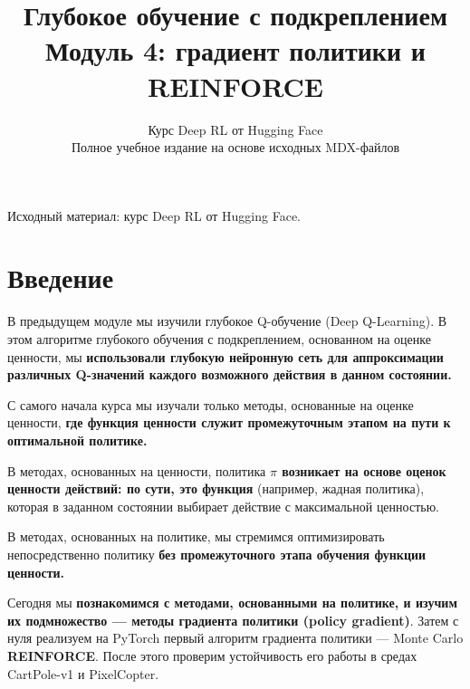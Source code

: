 \documentclass[11pt,a4paper]{article}
\title{\textbf{Глубокое обучение с подкреплением}\\[0.35em]\large Модуль 4: градиент политики и REINFORCE}
\author{Курс Deep RL от Hugging Face\\\small Полное учебное издание на основе исходных MDX-файлов}
\date{}
\begin{document}
\selectfont
\maketitle
\vspace{-0.8em}
\begin{center}\small\color{secondary}Исходный материал: курс Deep RL от Hugging Face.\end{center}
\begingroup\small\setlength{\parskip}{0pt}\tableofcontents\endgroup
\vspace{0.5em}
\clearpage

\section{Введение}\label{introduction}


В предыдущем модуле мы изучили глубокое Q-обучение (Deep Q-Learning). В этом алгоритме глубокого обучения с подкреплением, основанном на оценке ценности, мы \textbf{использовали глубокую нейронную сеть для аппроксимации различных Q-значений каждого возможного действия в данном состоянии.}

С самого начала курса мы изучали только методы, основанные на оценке ценности, \textbf{где функция ценности служит промежуточным этапом на пути к оптимальной политике.}


В методах, основанных на ценности, политика \textbf{\(\pi\) возникает на основе оценок ценности действий: по сути, это функция} (например, жадная политика), которая в заданном состоянии выбирает действие с максимальной ценностью.

В методах, основанных на политике, мы стремимся оптимизировать непосредственно политику \textbf{без промежуточного этапа обучения функции ценности.}

Сегодня мы \textbf{познакомимся с методами, основанными на политике, и изучим их подмножество --- методы градиента политики (policy gradient)}. Затем с нуля реализуем на PyTorch первый алгоритм градиента политики --- Monte Carlo \textbf{REINFORCE}. После этого проверим устойчивость его работы в средах CartPole-v1 и PixelCopter.
\end{document}
